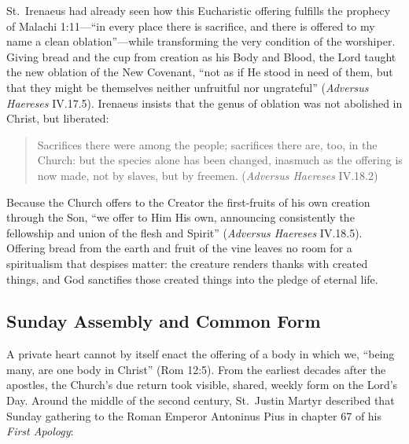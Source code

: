 St.\ Irenaeus had already seen how this Eucharistic offering fulfills the prophecy of Malachi 1:11---``in every place there is sacrifice, and there is offered to my name a clean oblation''---while transforming the very condition of the worshiper. Giving bread and the cup from creation as his Body and Blood, the Lord taught the new oblation of the New Covenant, ``not as if He stood in need of them, but that they might be themselves neither unfruitful nor ungrateful'' (\emph{Adversus Haereses} IV.17.5). Irenaeus insists that the genus of oblation was not abolished in Christ, but liberated:

\begin{quote}
Sacrifices there were among the people; sacrifices there are, too, in the Church: but the species alone has been changed, inasmuch as the offering is now made, not by slaves, but by freemen. (\emph{Adversus Haereses} IV.18.2)
\end{quote}

Because the Church offers to the Creator the first-fruits of his own creation through the Son, ``we offer to Him His own, announcing consistently the fellowship and union of the flesh and Spirit'' (\emph{Adversus Haereses} IV.18.5). Offering bread from the earth and fruit of the vine leaves no room for a spiritualism that despises matter: the creature renders thanks with created things, and God sanctifies those created things into the pledge of eternal life.

\subsection{Sunday Assembly and Common Form}

A private heart cannot by itself enact the offering of a body in which we, ``being many, are one body in Christ'' (Rom 12:5). From the earliest decades after the apostles, the Church's due return took visible, shared, weekly form on the Lord's Day. Around the middle of the second century, St.\ Justin Martyr described that Sunday gathering to the Roman Emperor Antoninus Pius in chapter 67 of his \emph{First Apology}:

